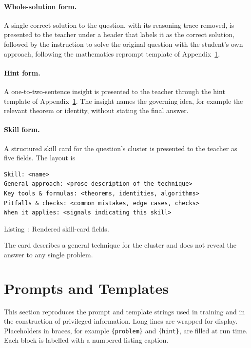 \documentclass{article}
\newcounter{promptlisting}
\newcommand{\listingcaption}[1]{%
  \vspace{-2pt}%
  {\centering\small Listing~\refstepcounter{promptlisting}\thepromptlisting: #1\par}%
  \vspace{6pt}}
\newenvironment{plst}{\par\addvspace{\medskipamount}\noindent\begin{minipage}{\columnwidth}}%
  {\end{minipage}\par\addvspace{\medskipamount}}
\begin{document}
\paragraph{Whole-solution form.} A single correct solution to the question, with
its reasoning trace removed, is presented to the teacher under a header that
labels it as the correct solution, followed by the instruction to solve the
original question with the student's own approach, following the mathematics
reprompt template of Appendix~\ref{app:prompts}.

\paragraph{Hint form.} A one-to-two-sentence insight is presented to the teacher
through the hint template of Appendix~\ref{app:prompts}. The insight names the
governing idea, for example the relevant theorem or identity, without stating the
final answer.

\paragraph{Skill form.} A structured skill card for the question's cluster is
presented to the teacher as five fields. The layout is
\begin{plst}
\begin{Verbatim}
Skill: <name>
General approach: <prose description of the technique>
Key tools & formulas: <theorems, identities, algorithms>
Pitfalls & checks: <common mistakes, edge cases, checks>
When it applies: <signals indicating this skill>
\end{Verbatim}
\listingcaption{Rendered skill-card fields.}
\end{plst}
The card describes a general technique for the cluster and does not reveal the
answer to any single problem.

\section{Prompts and Templates}
\label{app:prompts}

This section reproduces the prompt and template strings used in training and in
the construction of privileged information. Long lines are wrapped for display.
Placeholders in braces, for example \verb|{problem}| and \verb|{hint}|, are
filled at run time. Each block is labelled with a numbered listing caption.
\end{document}
